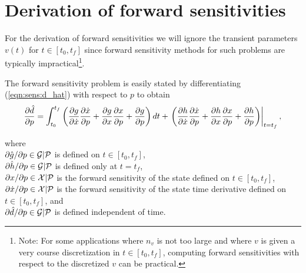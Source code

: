 \documentclass[pdf,ps2pdf,11pt]{SANDreport}
\begin{document}
\section{Derivation of forward sensitivities}
\label{rythmos:app:forward-sens-derivation}

For the derivation of forward sensitivities we will ignore the transient
parameters $v(t)$ for $t\in[t_0,t_f]$ since forward sensitivity methods for
such problems are typically impractical\footnote{Note: For some applications
where $n_v$ is not too large and where $v$ is given a very course
discretization in $t\in[t_0,t_f]$, computing forward sensitivities with respect
to the discretized $v$ can be practical.}.

The forward sensitivity problem is easily stated by differentiating
(\ref{eqn:sens:d_hat}) with respect to $p$ to obtain
%
\begin{equation}
\displaystyle{\frac{\partial \hat{d}}{\partial p}}
= \int_{t_0}^{t_f} \left(
    \displaystyle{\frac{\partial g}{\partial \dot{x}}} \displaystyle{\frac{\partial \dot{x}}{\partial p}} + \displaystyle{\frac{\partial g}{\partial x}} \displaystyle{\frac{\partial x}{\partial p}} +  \displaystyle{\frac{\partial g}{\partial p}}
    \right) dt
+ \left. \left(
    \displaystyle{\frac{\partial h}{\partial \dot{x}}} \displaystyle{\frac{\partial \dot{x}}{\partial p}} + \displaystyle{\frac{\partial h}{\partial x}} \displaystyle{\frac{\partial x}{\partial p}} + \displaystyle{\frac{\partial h}{\partial p}}
  \right) \right|_{t=t_f},
\label{eqn:sens:d_d_hat_d_p}
\end{equation}
\begin{tabbing}
\hspace{4ex}where\hspace{1ex}\= \\
\>  $\partial \hat{g} / \partial p \in \mathcal{G}|\mathcal{P}$ is defined on $t\in[t_0,t_f]$, \\
\>  $\partial \hat{h} / \partial p \in \mathcal{G}|\mathcal{P}$ is defined only at $t=t_f$, \\
\>  $\partial x / \partial p \in \mathcal{X}|\mathcal{P}$ is the forward sensitivity of the state defined on $t\in[t_0,t_f]$, \\
\>  $\partial \dot{x} / \partial p \in \mathcal{X}|\mathcal{P}$ is the forward sensitivity of the state time derivative defined on $t\in[t_0,t_f]$, and \\
\>  $\partial \hat{d} / \partial p \in \mathcal{G}|\mathcal{P}$ is defined independent of time.
\end{tabbing}
\end{document}
